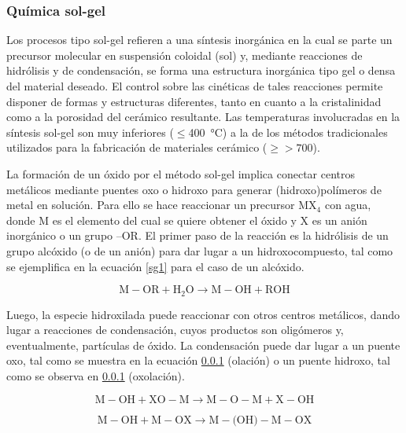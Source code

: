 	\subsubsection{Química sol-gel}

	Los procesos tipo sol-gel refieren a una síntesis inorgánica en la cual se parte un precursor molecular en suspensión coloidal (sol) y, mediante reacciones de hidrólisis y de condensación, se  forma una estructura inorgánica tipo gel o densa del material deseado. El control sobre las cinéticas de tales reacciones permite disponer de formas y estructuras diferentes, tanto en cuanto a la cristalinidad como a la porosidad del cerámico resultante. Las temperaturas involucradas en la síntesis sol-gel son muy inferiores ($\leq$\SI{400}{\celsius}) a la de los métodos tradicionales utilizados para la fabricación de materiales cerámico ($\geq > 700$).\cite{Brinker1990,Jolivet2000,Wright2001}

	La formación de un óxido por el método sol-gel implica conectar centros metálicos mediante puentes oxo o hidroxo para generar (hidroxo)polímeros de metal en solución. Para ello se hace reaccionar un precursor MX$_4$ con agua, donde M es el elemento del cual se quiere obtener el óxido y X es un anión inorgánico o un grupo –OR. El primer paso de la reacción es la hidrólisis de un grupo alcóxido (o de un anión) para dar lugar a un hidroxocompuesto, tal como se ejemplifica en la ecuación \ref{sg1} para el caso de un alcóxido.
			
			\begin{equation}
				\text{M}-\text{OR} + \text{H}_2\text{O} \longrightarrow \text{M}-\text{OH} + \text{ROH}\label{eq:sg1}
			\end{equation}

	Luego, la especie hidroxilada puede reaccionar con otros centros metálicos, dando lugar a reacciones de condensación, cuyos productos son oligómeros y, eventualmente, partículas de óxido. La condensación puede dar lugar a un puente oxo, tal como se muestra en la ecuación \ref{} (olación) o un puente hidroxo, tal como se observa en \ref{} (oxolación). 

			\begin{equation}
			\text{M}-\text{OH} + \text{XO}-\text{M} \longrightarrow \text{M}-\text{O}-\text{M} + \text{X}-\text{OH}
			\label{eq:sg2}
			\end{equation}

			\begin{equation}
			\text{M}-\text{OH} + \text{M}-\text{OX} \longrightarrow \text{M}-\text{(OH)}-\text{M}-\text{OX}
			\label{eq:sg3}
			\end{equation}	

